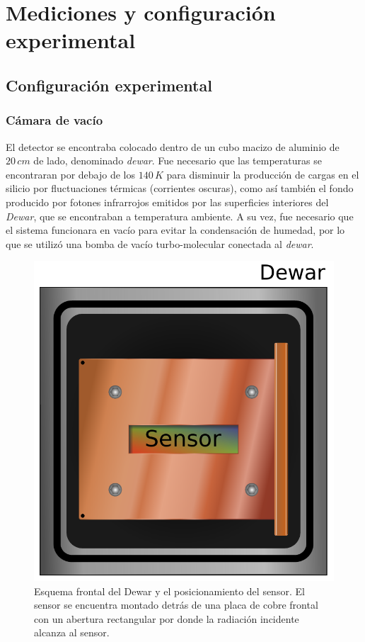 \chapter{Mediciones y configuración experimental \label{chap:ConfiguracionExperimental}}
\section{Configuración experimental}
\subsection{Cámara de vacío}
\noindent El detector se encontraba colocado dentro de un cubo macizo de aluminio de $20\,\si{cm}$ de lado, denominado \textit{dewar}. Fue necesario que las temperaturas se encontraran por debajo de los $140\,\si{K}$ para disminuir la producción de cargas en el silicio por fluctuaciones térmicas (corrientes oscuras), como así también el fondo producido por fotones infrarrojos emitidos por las superficies interiores del \textit{Dewar}, que se encontraban a temperatura ambiente. A su vez, fue necesario que el sistema funcionara en vacío para evitar la condensación de humedad, por lo que se utilizó una bomba de vacío turbo-molecular conectada al \textit{dewar}.
\begin{figure}%
    \centering
    \includegraphics[scale=0.5]{Figs/Frontal_Dewar_Sensor.pdf}
    \caption{\footnotesize{Esquema frontal del Dewar y el posicionamiento del sensor. El sensor se encuentra montado detrás de una placa de cobre frontal con un abertura rectangular por donde la radiación incidente alcanza al sensor.}}
    \label{fig:FrontalDewarYSensor}
\end{figure}
